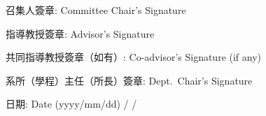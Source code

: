 \vfill

\noindent 召集人簽章: \hfill Committee Chair's Signature \hfill \underline{\hspace{5cm}}

\vspace{0.6cm}

\noindent 指導教授簽章: \hfill Advisor's Signature \hfill \underline{\hspace{5cm}}

\vspace{0.6cm}

\noindent 共同指導教授簽章（如有）: \hfill Co-advisor's Signature (if any) \hfill \underline{\hspace{3cm}}

\vspace{0.6cm}

\noindent 系所（學程）主任（所長）簽章: \hfill Dept.\ Chair's Signature \hfill \underline{\hspace{3cm}}

\vspace{0.6cm}

\noindent 日期: \hfill Date (yyyy/mm/dd) \hfill \underline{\hspace{2cm}} / \underline{\hspace{1.5cm}} / \underline{\hspace{1.5cm}}

\vspace{0.5cm}
